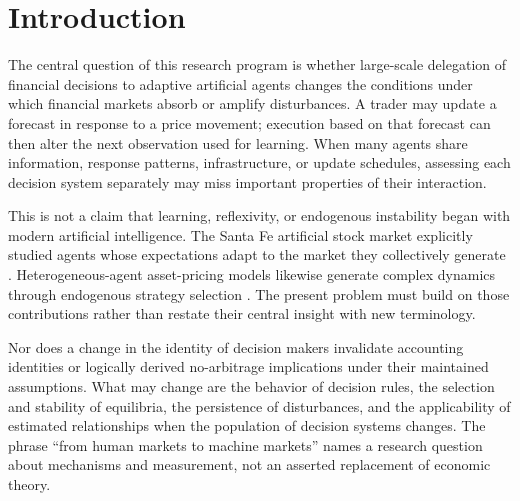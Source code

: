\documentclass[11pt,a4paper]{article}
\theoremstyle{definition}
\theoremstyle{remark}
\begin{document}
\begin{center}
\end{center}

\section{Introduction}
\label{sec:intro}
The central question of this research program is whether large-scale delegation of financial decisions to adaptive artificial agents changes the conditions under which financial markets absorb or amplify disturbances. A trader may update a forecast in response to a price movement; execution based on that forecast can then alter the next observation used for learning. When many agents share information, response patterns, infrastructure, or update schedules, assessing each decision system separately may miss important properties of their interaction.

This is not a claim that learning, reflexivity, or endogenous instability began with modern artificial intelligence. The Santa Fe artificial stock market explicitly studied agents whose expectations adapt to the market they collectively generate \citep{arthur1996}. Heterogeneous-agent asset-pricing models likewise generate complex dynamics through endogenous strategy selection \citep{brock1998}. The present problem must build on those contributions rather than restate their central insight with new terminology.

Nor does a change in the identity of decision makers invalidate accounting identities or logically derived no-arbitrage implications under their maintained assumptions. What may change are the behavior of decision rules, the selection and stability of equilibria, the persistence of disturbances, and the applicability of estimated relationships when the population of decision systems changes. The phrase ``from human markets to machine markets'' names a research question about mechanisms and measurement, not an asserted replacement of economic theory.
\end{document}
